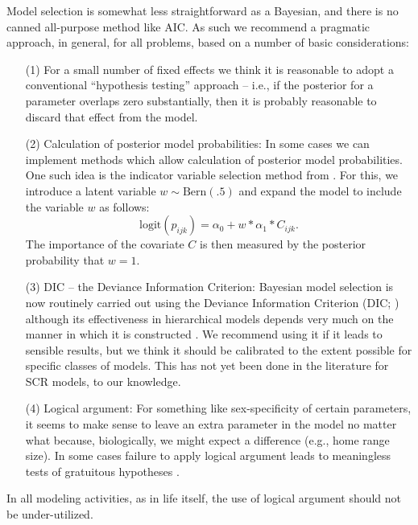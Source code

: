 Model selection is somewhat less straightforward as a Bayesian, and
there is no canned all-purpose method like AIC. As such we
recommend a pragmatic approach, in general, for all problems,
based on a number of basic considerations:
\begin{itemize}
\item[(1)] For a small number of fixed effects we think it is
  reasonable to adopt a conventional ``hypothesis testing'' approach
  -- i.e., if the posterior for a parameter overlaps zero
  substantially, then it is probably reasonable to discard that
  effect from the model.
\item[(2)] Calculation of posterior model probabilities: In some cases
  we can implement methods which allow calculation of posterior model
  probabilities. One such idea is the indicator variable selection
  method from \citet{kuo_mallick:1998}.  For this, we introduce a latent
  variable $w \sim \mbox{Bern}(.5)$ and expand the model to include
  the variable $w$ as follows:
\[
 \mbox{logit}(p_{ijk}) = \alpha_{0} + w*\alpha_{1}*C_{ijk}.
\]
The importance of the covariate $C$ is then measured by the posterior
probability that $w=1$.
\item[(3)] DIC -- the Deviance Information Criterion: Bayesian model
  selection is now routinely carried out using the Deviance
  Information Criterion (DIC; \citet{spiegelhalter_etal:2002})
  although its
  effectiveness in hierarchical models depends very much on the manner
  in which it is constructed \citep{millar:2009}.  We recommend using
  it if it leads to sensible results, but we think it should be
  calibrated to the extent possible for specific classes of models.
  This has not yet been done in the literature for SCR models, to our knowledge.
\item[(4)] Logical argument: For something like sex-specificity of
  certain parameters, it seems to make sense to leave an extra
  parameter in the model no matter what because, biologically, we might
 expect a difference (e.g., home range size).
In some cases failure to apply logical argument leads to
  meaningless tests of gratuitous hypotheses \citep{johnson:1999}.
\end{itemize}
In all modeling activities, as in life itself, the use of logical argument should not be under-utilized.

